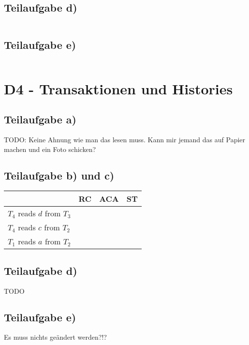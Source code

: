 \documentclass[a4paper,9pt]{scrartcl}
\newcommand{\cmark}{\ding{51}}%
\begin{document}
\subsection{Teilaufgabe d)}
\inputminted[linenos, numbersep=5pt, tabsize=4]{sql}{d3d.sql}

\subsection{Teilaufgabe e)}
\inputminted[linenos, numbersep=5pt, tabsize=4]{sql}{d3e.sql}

\section{D4 - Transaktionen und Histories}
\subsection{Teilaufgabe a)}
TODO: Keine Ahnung wie man das lesen muss. Kann mir jemand das auf
Papier machen und ein Foto schicken?


\subsection{Teilaufgabe b) und c)}
    \begin{tabular}{l|lll}
    ~                          & RC     & ACA    & ST     \\ \hline
    $T_4$ reads $d$ from $T_3$ & \cmark & \cmark & \cmark \\
    $T_4$ reads $c$ from $T_2$ & \cmark & \cmark & \cmark \\
    $T_1$ reads $a$ from $T_2$ & \cmark & \cmark & \cmark \\
    \end{tabular}

\subsection{Teilaufgabe d)}
TODO

\subsection{Teilaufgabe e)}
Es muss nichts geändert werden?!?
\end{document}
